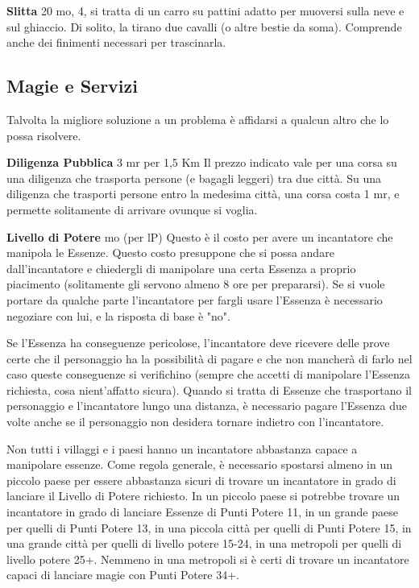 \documentclass[a4paper,11pt,twoside,openany]{book}
\begin{document}
\textbf{Slitta} 20 mo, 4, si tratta di un carro su pattini adatto per muoversi sulla neve e sul ghiaccio. Di solito, la tirano due cavalli (o altre bestie da soma). Comprende anche dei finimenti necessari per trascinarla.

\pagebreak

\subsection{Magie e Servizi}

\label{magie-e-servizi}

Talvolta la migliore soluzione a un problema è affidarsi a qualcun altro che lo possa risolvere.

\textbf{Diligenza Pubblica} 3 mr per 1,5 Km Il prezzo indicato vale per una corsa su una diligenza che trasporta persone (e bagagli leggeri) tra due città. Su una diligenza che trasporti persone entro la medesima città, una corsa costa 1 mr, e permette solitamente di arrivare ovunque si voglia.

\textbf{Livello di Potere}  mo (per lP) Questo è il costo per avere un incantatore che manipola le Essenze. Questo costo presuppone che si possa andare dall'incantatore e chiedergli di manipolare una certa Essenza a proprio piacimento (solitamente gli servono almeno 8 ore per prepararsi). Se si vuole portare da qualche parte l'incantatore per fargli usare l'Essenza è necessario negoziare con lui, e la risposta di base è "no".

Se l'Essenza ha conseguenze pericolose, l'incantatore deve ricevere delle prove certe che il personaggio ha la possibilità di pagare e che non mancherà di farlo nel caso queste conseguenze si verifichino (sempre che accetti di manipolare l'Essenza richiesta, cosa nient'affatto sicura). Quando si tratta di Essenze che trasportano il personaggio e l'incantatore lungo una distanza, è necessario pagare l'Essenza due volte anche se il personaggio non desidera tornare indietro con l'incantatore.

Non tutti i villaggi e i paesi hanno un incantatore abbastanza capace a manipolare essenze. Come regola generale, è necessario spostarsi almeno in un piccolo paese per essere abbastanza sicuri di trovare un incantatore in grado di lanciare il Livello di Potere richiesto. In un piccolo paese si potrebbe trovare un incantatore in grado di lanciare Essenze di Punti Potere 11, in un grande paese per quelli di Punti Potere 13, in una piccola città per quelli di Punti Potere 15, in una grande città per quelli di livello potere 15-24, in una metropoli per quelli di livello potere 25+. Nemmeno in una metropoli si è certi di trovare un incantatore capaci di lanciare magie con Punti Potere 34+.
\end{document}

